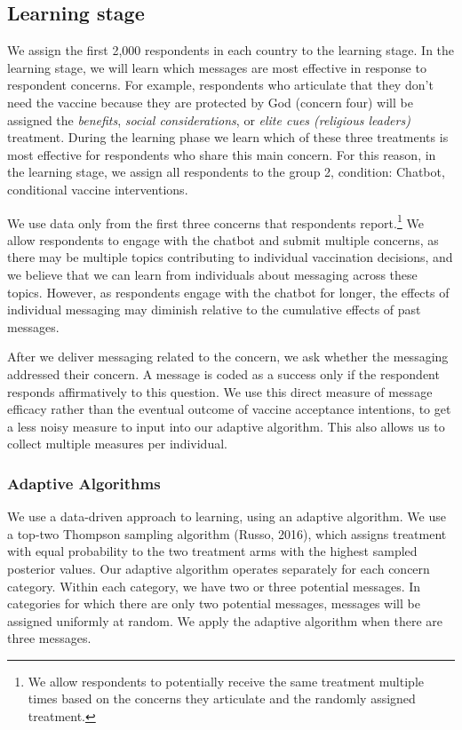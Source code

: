 \documentclass[letterpaper, 12pt, parskip=full,DIV=10]{scrartcl}
\begin{document}
\subsection{Learning stage}

We assign the first 2,000 respondents in each country to the learning stage. In the learning stage, we will learn which messages are most effective in response to respondent concerns.  For example, respondents who articulate that they don’t need the vaccine because they are protected by God (concern four) will be assigned the \textit{benefits}, \emph{social considerations}, or \emph{elite cues (religious leaders)} treatment. During the learning phase we learn which of these three treatments is most effective for respondents who share this main concern. For this reason, in the learning stage, we assign all respondents to the group 2, condition: Chatbot, conditional vaccine interventions. 

We use data only from the first three concerns that respondents report.\footnote{We allow respondents to potentially receive the same treatment multiple times based on the concerns they articulate and the randomly assigned treatment.} We allow respondents to engage with the chatbot and submit multiple concerns, as there may be multiple topics contributing to individual vaccination decisions, and we believe that we can learn from individuals about messaging across these topics. However, as respondents engage with the chatbot for longer, the effects of individual messaging may diminish relative to the cumulative effects of past messages. 

After we deliver messaging related to the concern, we ask whether the messaging addressed their concern. A message is coded as a success only if the respondent responds affirmatively to this question. We use this direct measure of message efficacy rather than the eventual outcome of vaccine acceptance intentions, to get a less noisy measure to input into our adaptive algorithm. This also allows us to collect multiple measures per individual. 

\subsubsection{Adaptive Algorithms}
We use a data-driven approach to learning, using an adaptive algorithm. We use a top-two Thompson sampling algorithm (Russo, 2016), which assigns treatment with equal probability to the two treatment arms with the highest sampled posterior values. Our adaptive algorithm operates separately for each concern category. Within each category, we have two or three potential messages. In categories for which there are only two potential messages, messages will be assigned uniformly at random. We apply the adaptive algorithm when there are three messages. 
\end{document}
